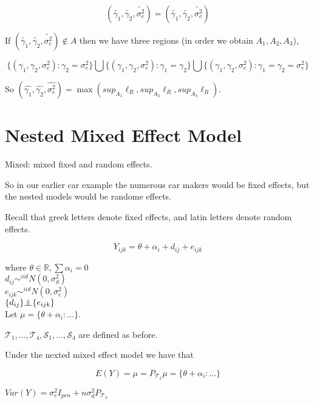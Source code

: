 \documentclass[11pt,fleqn]{book} %
\newcommand{\indep}{\rotatebox[origin=c]{90}{$\models$}}
\begin{document}
		$$(\tilde{\gamma_1}, \tilde{\gamma_2}, \tilde{\sigma_e^2}) = (\tilde{\gamma_1}, \tilde{\gamma_2}, \tilde{\sigma_e^2})$$ 

If $(\tilde{\gamma_1}, \tilde{\gamma_2}, \tilde{\sigma_e^2}) \notin A$ then we have three regions (in order we obtain $A_1, A_2, A_3$), 


		$$\{ (\gamma_1, \gamma_2, \sigma_e^2):  \gamma_2 = \sigma_e^2\}
			\bigcup \{ (\gamma_1, \gamma_2, \sigma_e^2): \gamma_1 = \gamma_2 \}
			\bigcup \{ (\gamma_1, \gamma_2, \sigma_e^2): \gamma_1 = \gamma_2 = \sigma_e^2\} $$

So $(\hat{\gamma_1}, \hat{\gamma_2}, \hat{\sigma_e^2}) = \max(sup_{A_1} \ell_R, sup_{A_2} \ell_R, sup_{A_3} \ell_R)$.





\section{Nested Mixed Effect Model}

Mixed: mixed fixed and random effects. 

So in our earlier car example the numerous car makers would be fixed effects, but the nested models would be randome effects. 

\begin{remark}
	Recall that greek letters denote fixed effects, and latin letters denote random effects. 
\end{remark}


\begin{definition}

	$$Y_{ijk} = \theta + \alpha_i + d_{ij} + e_{ijk}$$

where $\theta \in \mathbb{R}, \sum \alpha_i = 0$\\
$d_{ij} \sim^{iid} N(0, \sigma^2_d)$\\
$e_{ijk} \sim^{iid} N(0, \sigma^2_e)$\\
$\{d_{ij}\} \indep \{e_{ijk}\}$\\

Let $\mu = \{\theta + \alpha_i: \dots \}$. 

$\mathcal{T}_1, \dots, \mathcal{T}_4, \mathcal{S}_1, \dots, \mathcal{S}_4$ are defined as before. 

\end{definition}


\begin{theorem}
	Under the nexted mixed effect model we have that

			$$E(Y) = \mu = P_{\mathcal{T}_2}\mu = \{\theta + \alpha_i: \dots\} $$

			$Var(Y) = \sigma_e^2I_{pcn} + n\sigma_d^2 P_{\mathcal{T}_3}$
\end{theorem}
\end{document}
